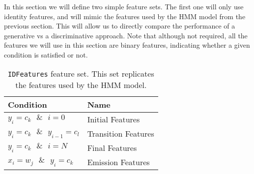 In this section we will define two simple feature sets. The first one
will only use identity features, and will mimic the features used by
the HMM model from the previous section. This will allow us to directly
compare the performance of a generative vs a discriminative
approach. Note that although not required, all the features we will use
in this section are binary features, indicating whether a given condition 
is satisfied or not. 

\begin{table}
\begin{center}
\begin{tabular}{|l|l|}
\hline
Condition & Name\\
\hline
$y_i = c_k \text{  } \& \text{  } i =0 $& Initial Features \\
\hline
$y_i = c_k \text{  } \& \text{  } y_{i-1} = c_l$& Transition Features \\
\hline
$y_i = c_k \text{  } \& \text{  } i = N$& Final Features \\
\hline
$x_i = w_j \text{  } \& \text{  } y_i = c_k$ & Emission Features \\
\hline
\end{tabular}
\caption{\label{id-features} {\tt IDFeatures} feature set. This set
  replicates the features used by the HMM model.}
\end{center}
\end{table}


